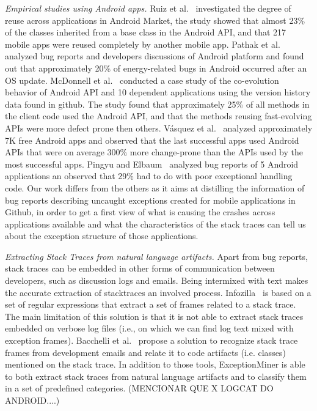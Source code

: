 \documentclass[conference]{IEEEtran}
\begin{document}
\textit{Empirical studies using Android apps.} Ruiz et al.~\cite{Ruiz12}
investigated the degree of reuse across applications in Android Market, the
study showed that almost 23\% of the classes inherited from a base class in the
Android API, and that 217 mobile apps were reused completely by another mobile
app. Pathak et al.~\cite{Patha11} analyzed bug reports and developers
discussions of Android platform and found out that approximately 20\% of
energy-related bugs in Android occurred after an OS update. McDonnell et
al.~\cite{McDon13} conducted a case study of the co-evolution behavior of
Android API and 10 dependent applications using the version history data found
in github. The study found that approximately 25\% of all methods in the client
code used the Android API, and that the methods reusing fast-evolving APIs were
more defect prone then others. Vásquez et al.~\cite{Linar13} analyzed
approximately 7K free Android apps and observed that the last successful apps
used Android APIs that were on average 300\% more change-prone than the APIs
used by the most successful apps. Pingyu and Elbaum~\cite{Zhang12} analyzed bug
reports of 5 Android applications an observed that 29\% had to do with poor
exceptional handling code. Our work differs from the others as it aims at
distilling the information of bug reports describing uncaught exceptions created
for mobile applications in Github, in order to get a first view
of what is causing the crashes across applications available and what the
characteristics of the stack traces can tell us about the exception structure of
those applications.

\textit{Extracting Stack Traces from natural language artifacts.} 
Apart from bug reports, stack traces can be embedded in other forms of
communication between developers, such as discussion logs and emails.
Being intermixed with text makes the accurate extraction of stacktraces 
an involved process.
Infozilla~\cite{bettenburg2008extracting}
is based on a set of regular expressions that extract a set of frames
related to a stack trace. The main limitation of this solution is that it is not
able to extract stack traces embedded on verbose log files (i.e., on which we
can find log text mixed with exception frames). Bacchelli
et al.~\cite{bacchelli2012content} propose a solution to recognize stack trace frames
from development emails and relate it to code artifacts (i.e. classes) mentioned
on the stack trace. In addition to those tools, ExceptionMiner is able to 
both extract stack traces from natural language artifacts and to 
classify them in a set of predefined categories.
(MENCIONAR QUE X%
LOGCAT DO ANDROID....)
\end{document}
